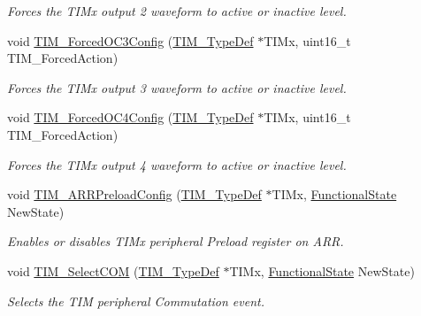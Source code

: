 \begin{DoxyCompactItemize}
\begin{DoxyCompactList}\small\item\em Forces the T\+I\+Mx output 2 waveform to active or inactive level. \end{DoxyCompactList}\item 
void \mbox{\hyperlink{group___t_i_m___exported___functions_ga920b0fb4ca44fceffd1c3e441feebd8f}{T\+I\+M\+\_\+\+Forced\+O\+C3\+Config}} (\mbox{\hyperlink{struct_t_i_m___type_def}{T\+I\+M\+\_\+\+Type\+Def}} $\ast$T\+I\+Mx, uint16\+\_\+t T\+I\+M\+\_\+\+Forced\+Action)
\begin{DoxyCompactList}\small\item\em Forces the T\+I\+Mx output 3 waveform to active or inactive level. \end{DoxyCompactList}\item 
void \mbox{\hyperlink{group___t_i_m___exported___functions_gaf0a0bbe74251e56d4b835d20b0a3aa63}{T\+I\+M\+\_\+\+Forced\+O\+C4\+Config}} (\mbox{\hyperlink{struct_t_i_m___type_def}{T\+I\+M\+\_\+\+Type\+Def}} $\ast$T\+I\+Mx, uint16\+\_\+t T\+I\+M\+\_\+\+Forced\+Action)
\begin{DoxyCompactList}\small\item\em Forces the T\+I\+Mx output 4 waveform to active or inactive level. \end{DoxyCompactList}\item 
void \mbox{\hyperlink{group___t_i_m___exported___functions_ga42b44b9fc2b0798d733720dd6bac1ac0}{T\+I\+M\+\_\+\+A\+R\+R\+Preload\+Config}} (\mbox{\hyperlink{struct_t_i_m___type_def}{T\+I\+M\+\_\+\+Type\+Def}} $\ast$T\+I\+Mx, \mbox{\hyperlink{group___exported__types_gac9a7e9a35d2513ec15c3b537aaa4fba1}{Functional\+State}} New\+State)
\begin{DoxyCompactList}\small\item\em Enables or disables T\+I\+Mx peripheral Preload register on A\+RR. \end{DoxyCompactList}\item 
void \mbox{\hyperlink{group___t_i_m___exported___functions_gaff2e7f9959b1b36e830df028c14accc8}{T\+I\+M\+\_\+\+Select\+C\+OM}} (\mbox{\hyperlink{struct_t_i_m___type_def}{T\+I\+M\+\_\+\+Type\+Def}} $\ast$T\+I\+Mx, \mbox{\hyperlink{group___exported__types_gac9a7e9a35d2513ec15c3b537aaa4fba1}{Functional\+State}} New\+State)
\begin{DoxyCompactList}\small\item\em Selects the T\+IM peripheral Commutation event. \end{DoxyCompactList}\item 

\end{DoxyCompactItemize}
